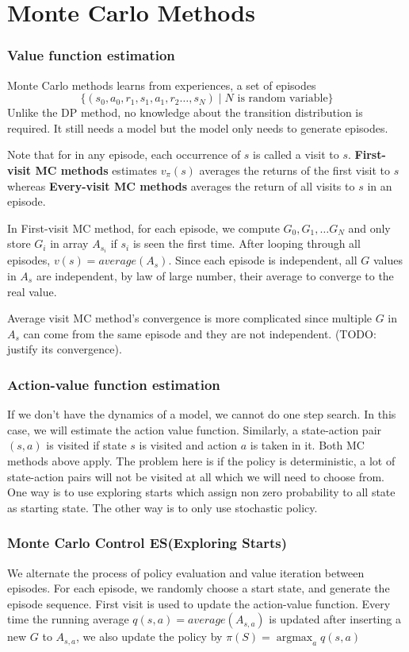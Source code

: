 \documentclass[twocolumn, 10pt]{article}
\DeclareMathOperator*{\argmax}{argmax}
\begin{document}
 \section{Monte Carlo Methods}
\subsubsection*{Value function estimation}
Monte Carlo methods learns from experiences, a set of episodes 
$$\{(s_0, a_0, r_1,  s_1, a_1, r_2 \ldots, s_N) \mid N \mbox{ is random variable} \}$$ 
Unlike the DP method, no knowledge about the transition distribution is required. It still needs a model but the model only needs to generate episodes. 

Note that for in any episode, each occurrence of $s$ is called a visit to $s$. \textbf{First-visit MC methods} estimates $v_{\pi}(s)$ averages the returns of the first visit to $s$ whereas \textbf{Every-visit MC methods} averages the return of all visits to $s$ in an episode. 

In First-visit MC method, for each episode, we compute $G_0, G_1, \ldots G_N$ and only store $G_i$ in array $A_{s_i}$ if $s_i$ is seen the first time. After looping through all episodes, $v(s) = average(A_{s})$. Since each episode is independent, all $G$ values in $A_{s}$ are independent, by law of large number, their average to converge to the real value.

Average visit MC method's convergence is more complicated since multiple $G$ in $A_{s}$ can come from the same episode and they are not independent. (TODO: justify its convergence).

\subsubsection*{Action-value function estimation}
If we don't have the dynamics of a model, we cannot do one step search. In this case, we will estimate the action value function. Similarly, a state-action pair $(s,a)$ is visited if state $s$ is visited and action $a$ is taken in it. Both MC methods above apply. The problem here is if the policy is deterministic, a lot of state-action pairs will not be visited at all which we will need to choose from. One way is to use exploring starts which assign non zero probability to all state as starting state. The other way is to only use stochastic policy.

\subsubsection*{Monte Carlo Control ES(Exploring Starts)}
We alternate the process of policy evaluation and value iteration between episodes. For each episode, we randomly choose a start state, and generate the episode sequence. First visit is used to update the action-value function. Every time the running average $q(s, a) = average(A_{s,a})$ is updated after inserting a new $G$ to $A_{s,a}$, we also update the policy by $ \pi(S) = \argmax_{a} q(s, a)$
\end{document}
